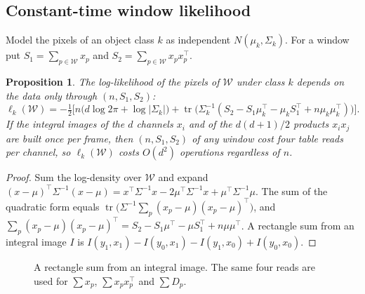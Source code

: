 \documentclass[11pt,a4paper]{article}
\newtheorem{proposition}{Proposition}
\theoremstyle{definition}
\DeclareMathOperator{\tr}{tr}
\begin{document}
\subsection{Constant-time window likelihood}\label{sec:window}
Model the pixels of an object class $k$ as independent $N(\mu_k,\Sigma_k)$.
For a window put $S_1=\sum_{p\in\mathcal W}x_p$ and $S_2=\sum_{p\in\mathcal W}x_px_p^{\top}$.

\begin{proposition}\label{prop:window}
The log-likelihood of the pixels of $\mathcal W$ under class $k$ depends on the data only through $(n,S_1,S_2)$:
\begin{equation}\label{eq:loglik}
\ell_k(\mathcal W)=-\tfrac12\Big[n\big(d\log 2\pi+\log|\Sigma_k|\big)+\tr\!\big(\Sigma_k^{-1}(S_2-S_1\mu_k^{\top}-\mu_kS_1^{\top}+n\mu_k\mu_k^{\top})\big)\Big].
\end{equation}
If the integral images of the $d$ channels $x_i$ and of the $d(d+1)/2$ products $x_ix_j$ are built once per frame, then $(n,S_1,S_2)$ of any window cost four table reads per channel, so $\ell_k(\mathcal W)$ costs $O(d^2)$ operations regardless of $n$.
\end{proposition}
\begin{proof}
Sum the log-density over $\mathcal W$ and expand $(x-\mu)^{\top}\Sigma^{-1}(x-\mu)=x^{\top}\Sigma^{-1}x-2\mu^{\top}\Sigma^{-1}x+\mu^{\top}\Sigma^{-1}\mu$.
The sum of the quadratic form equals $\tr\big(\Sigma^{-1}\sum_p(x_p-\mu)(x_p-\mu)^{\top}\big)$, and $\sum_p(x_p-\mu)(x_p-\mu)^{\top}=S_2-S_1\mu^{\top}-\mu S_1^{\top}+n\mu\mu^{\top}$.
A rectangle sum from an integral image $I$ is $I(y_1,x_1)-I(y_0,x_1)-I(y_1,x_0)+I(y_0,x_0)$.
\end{proof}
\begin{figure}[t]
\centering
{}
\caption{A rectangle sum from an integral image. The same four reads are used for $\sum x_p$, $\sum x_px_p^\top$ and $\sum D_p$.}
\label{fig:integral}
\end{figure}
\end{document}
